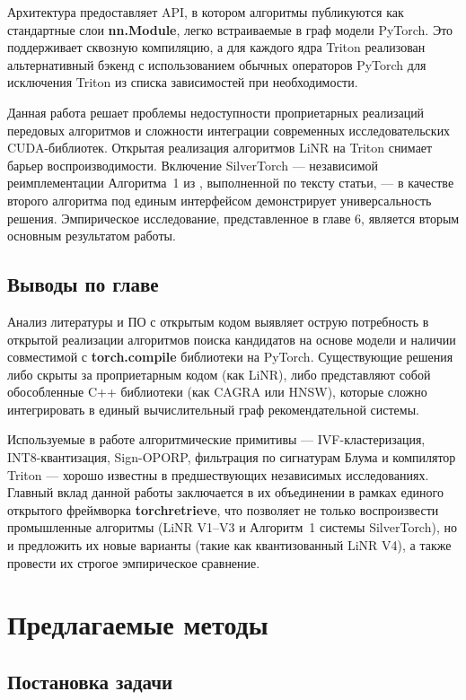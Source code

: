 \documentclass[14pt,a4paper]{extreport}
\numberwithin{figure}{chapter}
\numberwithin{table}{chapter}
\numberwithin{equation}{chapter}
\newcommand{\chapterconclusions}{
    \section{Выводы по главе}
}
\begin{document}
Архитектура предоставляет API, в котором алгоритмы публикуются как стандартные слои \textbf{nn.Module}, легко 
встраиваемые в граф модели PyTorch. Это поддерживает сквозную компиляцию, а для каждого ядра Triton реализован 
альтернативный бэкенд с использованием обычных операторов PyTorch для исключения Triton из списка зависимостей при необходимости.

Данная работа решает проблемы недоступности проприетарных реализаций передовых алгоритмов и сложности интеграции современных исследовательских CUDA-библиотек.
Открытая реализация алгоритмов LiNR на Triton снимает барьер воспроизводимости. Включение SilverTorch --- независимой реимплементации Алгоритма~1 из \cite{xue2025silvertorch}, выполненной по тексту статьи, --- в качестве второго алгоритма под единым интерфейсом демонстрирует универсальность решения.
Эмпирическое исследование, представленное в главе 6, является вторым основным результатом работы.

\chapterconclusions

Анализ литературы и ПО с открытым кодом выявляет острую потребность в открытой реализации алгоритмов поиска кандидатов на основе модели и наличии совместимой с \textbf{torch.compile} библиотеки на PyTorch.
Существующие решения либо скрыты за проприетарным кодом (как LiNR), либо представляют собой обособленные C++ библиотеки (как CAGRA или HNSW), которые сложно интегрировать в единый вычислительный граф рекомендательной системы.

Используемые в работе алгоритмические примитивы --- IVF-кластеризация, INT8-квантизация, Sign-OPORP, фильтрация по 
сигнатурам Блума и компилятор Triton --- хорошо известны в предшествующих независимых исследованиях. Главный вклад данной 
работы заключается в их объединении в рамках единого открытого фреймворка \textbf{torchretrieve}, что позволяет не 
только воспроизвести промышленные алгоритмы (LiNR V1--V3 и Алгоритм~1 системы SilverTorch), но и предложить их новые 
варианты (такие как квантизованный LiNR V4), а также провести их строгое эмпирическое сравнение.

\chapter{Предлагаемые методы}

\section{Постановка задачи}
\end{document}
